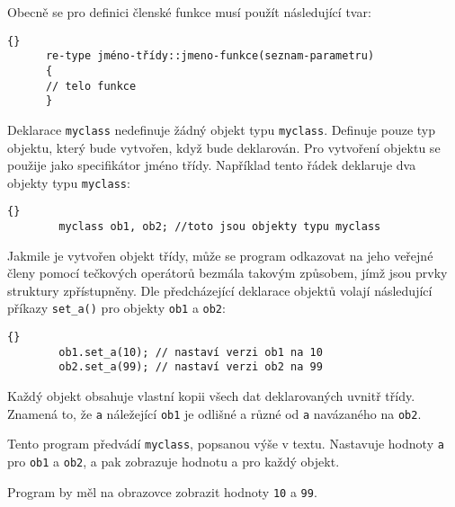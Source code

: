       Obecně se pro definici členské funkce musí použít následující tvar:
      \begin{lstlisting}{}
      re-type jméno-třídy::jmeno-funkce(seznam-parametru)
      {
      // telo funkce
      }
      \end{lstlisting}
      Deklarace \lstinline[basicstyle=\ttfamily]!myclass! nedefinuje žádný objekt typu 
      \lstinline[basicstyle=\ttfamily]!myclass!. Definuje pouze typ objektu, který bude vytvořen, 
      když bude deklarován. Pro vytvoření objektu se použije jako specifikátor jméno třídy. 
      Například tento řádek deklaruje dva objekty typu \lstinline[basicstyle=\ttfamily]!myclass!:
      \begin{lstlisting}{}
        myclass ob1, ob2; //toto jsou objekty typu myclass
      \end{lstlisting}
      Jakmile je vytvořen objekt třídy, může se program odkazovat na jeho veřejné členy pomocí 
      tečkových operátorů bezmála takovým způsobem, jímž jsou prvky struktury zpřístupněny. Dle 
      předcházející deklarace objektů volají následující příkazy 
      \lstinline[basicstyle=\ttfamily]!set_a()! pro objekty 
      \lstinline[basicstyle=\ttfamily]!ob1! a \lstinline[basicstyle=\ttfamily]!ob2!:
      \begin{lstlisting}{}
        ob1.set_a(10); // nastaví verzi ob1 na 10
        ob2.set_a(99); // nastaví verzi ob2 na 99
      \end{lstlisting}
      Každý objekt obsahuje vlastní kopii všech dat deklarovaných uvnitř třídy. Znamená to, že 
      \lstinline[basicstyle=\ttfamily]!a! náležející \lstinline[basicstyle=\ttfamily]!ob1! je 
      odlišné a různé od \lstinline[basicstyle=\ttfamily]!a! navázaného na 
      \lstinline[basicstyle=\ttfamily]!ob2!.
  
      \begin{example}
         Tento program předvádí \lstinline[basicstyle=\ttfamily]!myclass!, popsanou výše v textu. 
         Nastavuje hodnoty \lstinline[basicstyle=\ttfamily]!a! pro 
         \lstinline[basicstyle=\ttfamily]!ob1! a 
         \lstinline[basicstyle=\ttfamily]!ob2!, a pak zobrazuje hodnotu a pro každý objekt.
         
         Program by měl na obrazovce zobrazit hodnoty \lstinline[basicstyle=\ttfamily]!10! a 
         \lstinline[basicstyle=\ttfamily]!99!.
      \end{example}
  
